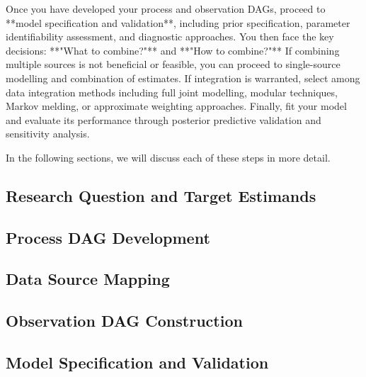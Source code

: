 \documentclass{article}
\begin{document}
Once you have developed your process and observation DAGs, proceed to **model specification and validation**, including prior specification, parameter identifiability assessment, and diagnostic approaches.
You then face the key decisions: **"What to combine?"** and **"How to combine?"**
If combining multiple sources is not beneficial or feasible, you can proceed to single-source modelling and combination of estimates.
If integration is warranted, select among data integration methods including full joint modelling, modular techniques, Markov melding, or approximate weighting approaches.
Finally, fit your model and evaluate its performance through posterior predictive validation and sensitivity analysis.

In the following sections, we will discuss each of these steps in more detail.

\subsection{Research Question and Target Estimands}

\subsection{Process DAG Development}

\subsection{Data Source Mapping}

\subsection{Observation DAG Construction}

\subsection{Model Specification and Validation}
\end{document}
